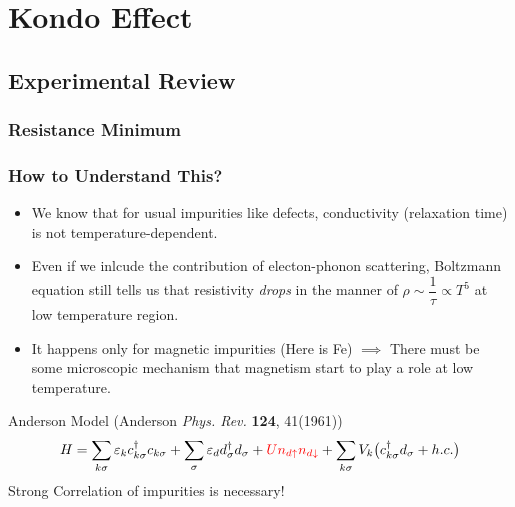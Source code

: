 \documentclass[10pt,aspectratio=43,xcolor=x11names,t]{beamer}%
\begin{document}
\iffalse
\section{Kondo Effect}
	\subsection{Experimental Review}
		\begin{frame}[t]\frametitle{Resistance Minimum}

		\end{frame}
		\begin{frame}[t]\frametitle{How to Understand This?}
			\begin{itemize}
				\item We know that for usual impurities like defects, conductivity (relaxation time) is not temperature-dependent.
				\item Even if we inlcude the contribution of electon-phonon scattering, Boltzmann equation still tells us that resistivity \emph{drops} in the manner of $\rho\sim\dfrac{1}{\tau}\propto T^5$ at low temperature region.
				\item It happens only for {\color{blue}magnetic impurities} (Here is Fe) $\implies$ There must be some microscopic mechanism that magnetism start to play a role at low temperature.
			\end{itemize}
			\pause
			\begin{block}{Anderson Model (Anderson \textit{Phys. Rev.} \textbf{124}, 41(1961))}
				\begin{equation*}
					H=\sum_{k \sigma}\varepsilon_kc_{k\sigma}^\dagger c_{k\sigma}+\sum_{\sigma}\varepsilon_d d_{\sigma}^\dagger d_{\sigma}+{\color{red}Un_{d\uparrow}n_{d\downarrow}}+\sum_{k\sigma}V_k\big(c_{k\sigma}^\dagger d_{\sigma}+h.c.\big)
				\end{equation*}
				\centering Strong Correlation of impurities is necessary!
			\end{block}	
		\end{frame}
\end{document}

